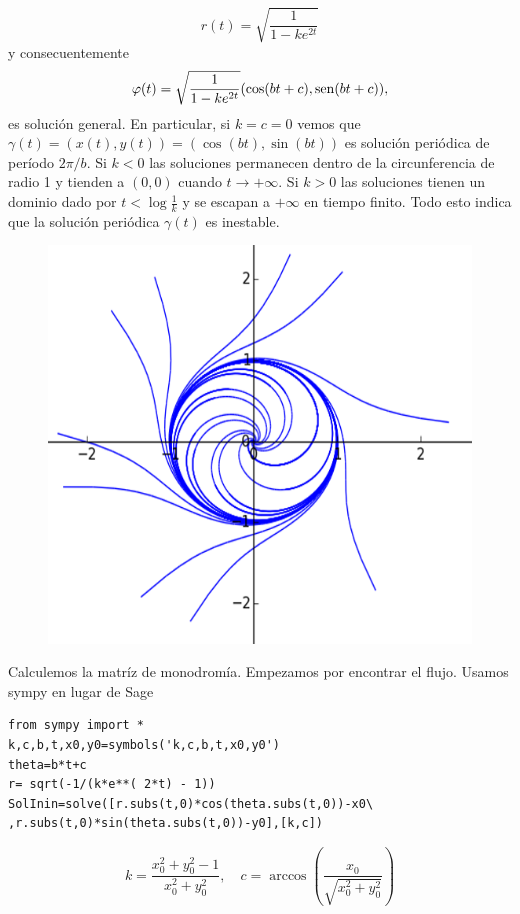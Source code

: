 \begin{ejemplo}{}
\[
 r(t)=\sqrt{\frac{1}{1-ke^{2t}}}
\]
y consecuentemente
\begin{equation}\label{eq:flujo_ejemplo6.5}
 \varphi(t)=\sqrt{\frac{1}{1-ke^{2t}}}(\cos(bt+c),\operatorname{sen}(bt+c)),
\end{equation}
es solución general. 
En particular, si $k=c=0$ vemos que   $\gamma(t)=(x(t),y(t))=(\cos(bt),\sin(bt))$ es solución periódica de período $2\pi/b$. Si $k<0$ las soluciones  permanecen dentro de la circunferencia  de radio 1 y tienden a $(0,0)$ cuando $t\to+\infty$. Si $k>0$   las soluciones tienen un dominio dado por  $t<\log\frac{1}{k}$ y se escapan a $+\infty$ en tiempo finito. Todo esto indica que la solución periódica   $\gamma(t)$ es inestable. 
\begin{figure}
 \includegraphics[scale=.4]{imagenes/sol_rotadas.png}
\end{figure}
Calculemos la matríz de monodromía. Empezamos por encontrar el flujo. Usamos sympy en lugar de Sage
\begin{lstlisting}
from sympy import *
k,c,b,t,x0,y0=symbols('k,c,b,t,x0,y0')
theta=b*t+c
r= sqrt(-1/(k*e**( 2*t) - 1))
SolInin=solve([r.subs(t,0)*cos(theta.subs(t,0))-x0\
,r.subs(t,0)*sin(theta.subs(t,0))-y0],[k,c])
\end{lstlisting}

\begin{equation}\label{eq:para_ejemplo6.5}
k=\frac{x_{0}^{2} + y_{0}^{2} - 1}{x_{0}^{2} + y_{0}^{2}}, \quad c=\operatorname{arccos}{\left (\frac{x_{0}}{\sqrt{x_{0}^{2} + y_{0}^{2}}} \right )} 
\end{equation}





\end{ejemplo}
